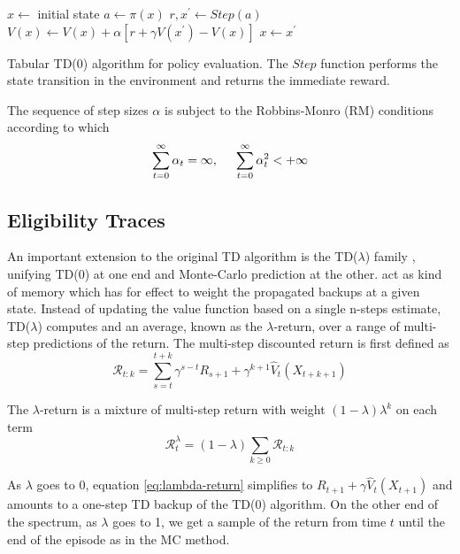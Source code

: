 \begin{algorithm}
\DontPrintSemicolon
{}
$x \leftarrow$ initial state\;
 {
$a \leftarrow \pi(x)$\;
$r, x^\prime \leftarrow Step(a)$\;
$V(x) \leftarrow V(x) + \alpha\left[ r + \gamma V(x^\prime) - V(x) \right]$ \;
$x \leftarrow x^\prime$
}
\caption{Tabular TD(0) algorithm for policy evaluation. The $Step$ function performs
the state transition in the environment and returns the immediate reward.}
\label{alg:td0}
\end{algorithm}

The sequence of step sizes $\alpha$ is subject to the Robbins-Monro (RM) conditions
according to which
\begin{equation}
\sum_{t=0}^\infty \alpha_t = \infty, \hspace{5mm} 
\sum_{t=0}^\infty \alpha_t^2 < + \infty
\end{equation}

\subsection{Eligibility Traces}

An important extension to the original TD algorithm is the TD($\lambda$) family
\cite{Sutton1984}, unifying TD(0) at one end and Monte-Carlo prediction at the other.
 act as kind of memory which has for effect to weight the
propagated backups at a given state. Instead of updating the value function based on 
a single n-steps estimate, TD($\lambda$) computes and an average, known as the
$\lambda$-return, over a range of multi-step predictions of the return. The multi-step discounted return is first defined as
\begin{equation}
\mathcal{R}_{t:k} = \sum_{s=t}^{t+k} \gamma^{s-t}R_{s+1} +
\gamma^{k+1}\hat{V}_t(X_{t+k+1})
\end{equation}

The $\lambda$-return is a mixture of multi-step return with weight $(1 -
\lambda)\lambda^k$ on each term
\begin{equation}
\mathcal{R}_t^\lambda = (1 - \lambda)\sum_{k \geq 0} \mathcal{R}_{t:k}
\label{eq:lambda-return}
\end{equation}

As $\lambda$ goes to 0, equation \ref{eq:lambda-return}  simplifies to $R_{t+1} +
\gamma \hat{V}_t (X_{t+1})$ and amounts to a one-step TD backup of the TD(0)
algorithm. On the other end of the spectrum, as $\lambda$ goes to 1, we get a sample
of the return from time $t$ until the end of the episode as in the MC method.

